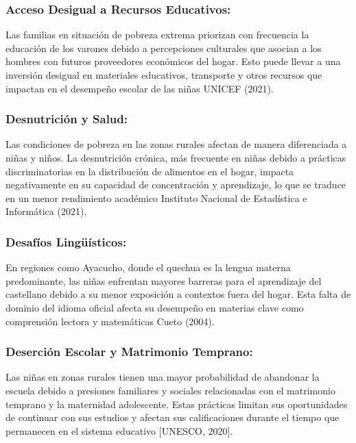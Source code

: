 \documentclass[
]{article}
\begin{document}
\subsubsection{Acceso Desigual a Recursos
Educativos:}\label{acceso-desigual-a-recursos-educativos}

Las familias en situación de pobreza extrema priorizan con frecuencia la
educación de los varones debido a percepciones culturales que asocian a
los hombres con futuros proveedores económicos del hogar. Esto puede
llevar a una inversión desigual en materiales educativos, transporte y
otros recursos que impactan en el desempeño escolar de las niñas UNICEF
(2021).

\subsubsection{Desnutrición y Salud:}\label{desnutriciuxf3n-y-salud}

Las condiciones de pobreza en las zonas rurales afectan de manera
diferenciada a niñas y niños. La desnutrición crónica, más frecuente en
niñas debido a prácticas discriminatorias en la distribución de
alimentos en el hogar, impacta negativamente en su capacidad de
concentración y aprendizaje, lo que se traduce en un menor rendimiento
académico Instituto Nacional de Estadística e Informática (2021).

\subsubsection{Desafíos
Lingüísticos:}\label{desafuxedos-linguxfcuxedsticos}

En regiones como Ayacucho, donde el quechua es la lengua materna
predominante, las niñas enfrentan mayores barreras para el aprendizaje
del castellano debido a su menor exposición a contextos fuera del hogar.
Esta falta de dominio del idioma oficial afecta su desempeño en materias
clave como comprensión lectora y matemáticas Cueto (2004).

\subsubsection{Deserción Escolar y Matrimonio
Temprano:}\label{deserciuxf3n-escolar-y-matrimonio-temprano}

Las niñas en zonas rurales tienen una mayor probabilidad de abandonar la
escuela debido a presiones familiares y sociales relacionadas con el
matrimonio temprano y la maternidad adolescente. Estas prácticas limitan
sus oportunidades de continuar con sus estudios y afectan sus
calificaciones durante el tiempo que permanecen en el sistema educativo
{[}UNESCO, 2020{]}.
\end{document}
